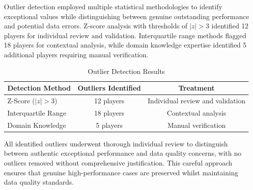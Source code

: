 Outlier detection employed multiple statistical methodologies to identify exceptional values while distinguishing between genuine outstanding performance and potential data errors. Z-score analysis with thresholds of $|z| > 3$ identified 12 players for individual review and validation. Interquartile range methods flagged 18 players for contextual analysis, while domain knowledge expertise identified 5 additional players requiring manual verification.

\begin{table}[h]
\centering
\caption{Outlier Detection Results}
\label{tab:outliers}
\begin{tabular}{lcc}
\toprule
\textbf{Detection Method} & \textbf{Outliers Identified} & \textbf{Treatment} \\
\midrule
Z-Score ($|z| > 3$) & 12 players & Individual review and validation \\
Interquartile Range & 18 players & Contextual analysis \\
Domain Knowledge & 5 players & Manual verification \\
\bottomrule
\end{tabular}
\end{table}

All identified outliers underwent thorough individual review to distinguish between authentic exceptional performance and data quality concerns, with no outliers removed without comprehensive justification. This careful approach ensures that genuine high-performance cases are preserved whilst maintaining data quality standards.